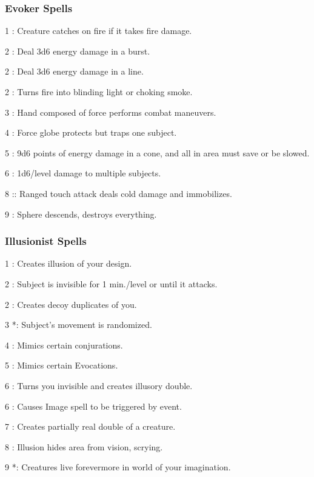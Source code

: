 \subsubsection{Evoker Spells}
\begin{list}{}{\leftmargin=1em}
\item[1] : Creature catches on fire if it takes fire damage.
\item[2] : Deal 3d6 energy damage in a burst.
\item[2] : Deal 3d6 energy damage in a line.
\item[2] : Turns fire into blinding light or choking smoke.
\item[3] : Hand composed of force performs combat maneuvers.
\item[4] : Force globe protects but traps one subject.
\item[5] : 9d6 points of energy damage in a cone, and all in area must save or be slowed.
\item[6] : 1d6/level damage to multiple subjects.
\item[8] :: Ranged touch attack deals cold damage and immobilizes.
\item[9] : Sphere descends, destroys everything.
\end{list}
\subsubsection{Illusionist Spells}
\begin{list}{}{\leftmargin=1em}
\item[1] : Creates illusion of your design.
\item[2] : Subject is invisible for 1 min./level or until it attacks.
\item[2] : Creates decoy duplicates of you.
\item[3] *: Subject's movement is randomized.
\item[4] : Mimics certain conjurations.
\item[5] : Mimics certain Evocations.
\item[6] : Turns you invisible and creates illusory double.
\item[6] : Causes Image spell to be triggered by event.
\item[7] : Creates partially real double of a creature.
\item[8] : Illusion hides area from vision, scrying.
\item[9] *: Creatures live forevermore in world of your imagination.
\end{list}
